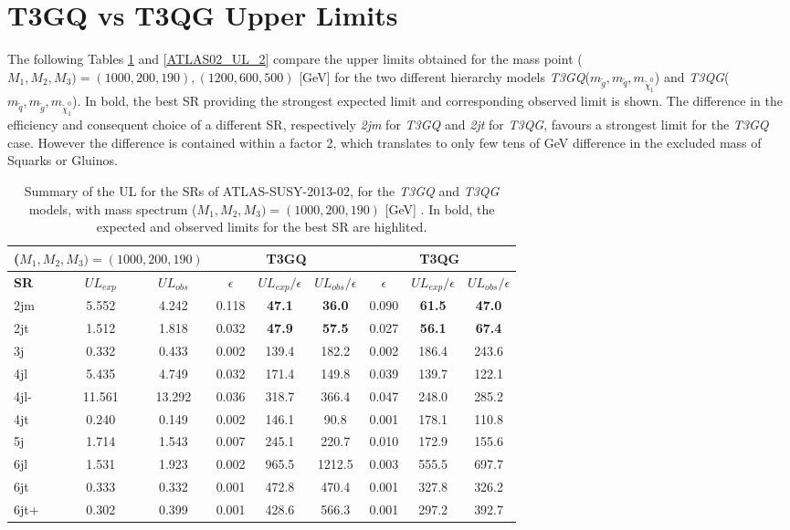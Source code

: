 \documentclass[a4paper,11pt]{article}
\begin{document}
\section{T3GQ vs T3QG Upper Limits}
The following Tables \ref{ATLAS02_UL} and \ref{ATLAS02_UL_2}  compare the upper limits obtained for the mass point ($M_1,M_2,M_3) = (1000,200,190),(1200,600,500)$ [GeV] for the two different hierarchy models \textit{T3GQ}($m_{\tilde g}, m_{\tilde q}, m_{\tilde \chi _1 ^0 }$) and \textit{T3QG}($m_{\tilde q}, m_{\tilde g}, m_{\tilde \chi _1 ^0 }$). In bold, the best SR providing the strongest expected limit and corresponding observed limit is shown. The difference in the efficiency and consequent choice of a different SR, respectively \textit{2jm} for \textit{T3GQ} and \textit{2jt} for \textit{T3QG}, favours a strongest limit for the \textit{T3GQ} case. However the difference is contained within a factor 2, which translates to only few tens of GeV difference in the excluded mass of Squarks or Gluinos.

\begin{table}[!b]
\centering
\renewcommand\arraystretch{1.3} 
\scriptsize
\begin{tabular}{ l c c    c c c  |  c c c  }
\toprule \toprule
\multicolumn{3}{c}{($M_1,M_2,M_3) = (1000,200,190)$} & \multicolumn{3}{c}{ \textbf{T3GQ}} & \multicolumn{3}{c}{ \textbf{T3QG}} \\  \toprule 
\textbf{SR} & $UL_{exp}$ & $UL_{obs}$ & $\epsilon$ &  $UL_{exp}/\epsilon$ & $UL_{obs}/\epsilon$ & $\epsilon$ & $UL_{exp}/ \epsilon$ & $UL_{obs}/ \epsilon$ \\
2jm & 5.552 &  4.242 &  0.118  & \textbf{47.1} &  \textbf{36.0}  &  0.090 &  \textbf{61.5}  & \textbf{47.0 }\\
2jt  & 1.512  & 1.818 &  0.032  & \textbf{47.9} &  \textbf{57.5}  &  0.027 &  \textbf{56.1}  & \textbf{67.4} \\
3j &  0.332 &  0.433  & 0.002 &  139.4 &  182.2  &  0.002 &  186.4 &  243.6 \\ 
4jl  & 5.435 &  4.749  & 0.032  & 171.4  & 149.8  &  0.039 &  139.7  & 122.1 \\
4jl-  & 11.561 &  13.292 &  0.036  & 318.7 &  366.4  &  0.047 &  248.0 &  285.2 \\
4jt  & 0.240  & 0.149  & 0.002  & 146.1  & 90.8 &   0.001  & 178.1  & 110.8 \\
5j  & 1.714  & 1.543  & 0.007 &  245.1 &  220.7  &  0.010  & 172.9  & 155.6 \\
6jl  & 1.531  & 1.923  & 0.002  & 965.5 &  1212.5  & 0.003  & 555.5 &  697.7 \\
6jt &  0.333  & 0.332 &  0.001  & 472.8  & 470.4 &  0.001 &  327.8  & 326.2 \\
6jt+  & 0.302 &  0.399 &  0.001  & 428.6  & 566.3  & 0.001  & 297.2  & 392.7 \\
\bottomrule \bottomrule
\end{tabular}
\caption{Summary of the UL for the SRs of ATLAS-SUSY-2013-02, for the \textit{T3GQ} and \textit{T3QG} models, with mass spectrum ($M_1,M_2,M_3) = (1000,200,190)$ [GeV] . In bold, the expected and observed limits for the best SR are highlited.}
\label{ATLAS02_UL}
\end{table}
\end{document}
